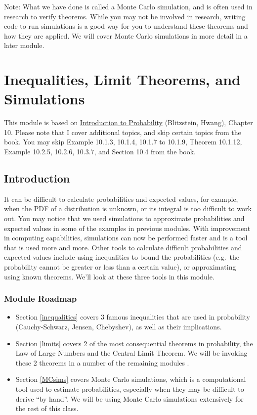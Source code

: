 \documentclass[
]{book}
\providecommand{\tightlist}{%
  \setlength{\itemsep}{0pt}\setlength{\parskip}{0pt}}
\begin{document}
Note: What we have done is called a Monte Carlo simulation, and is often used in research to verify theorems. While you may not be involved in research, writing code to run simulations is a good way for you to understand these theorems and how they are applied. We will cover Monte Carlo simulations in more detail in a later module.

\hypertarget{inequalities-limit-theorems-and-simulations}{%
\chapter{Inequalities, Limit Theorems, and Simulations}\label{inequalities-limit-theorems-and-simulations}}

This module is based on \href{https://stat110.hsites.harvard.edu/}{Introduction to Probability} (Blitzstein, Hwang), Chapter 10. Please note that I cover additional topics, and skip certain topics from the book. You may skip Example 10.1.3, 10.1.4, 10.1.7 to 10.1.9, Theorem 10.1.12, Example 10.2.5, 10.2.6, 10.3.7, and Section 10.4 from the book.

\hypertarget{introduction-2}{%
\section{Introduction}\label{introduction-2}}

It can be difficult to calculate probabilities and expected values, for example, when the PDF of a distribution is unknown, or its integral is too difficult to work out. You may notice that we used simulations to approximate probabilities and expected values in some of the examples in previous modules. With improvement in computing capabilities, simulations can now be performed faster and is a tool that is used more and more. Other tools to calculate difficult probabilities and expected values include using inequalities to bound the probabilities (e.g.~the probability cannot be greater or less than a certain value), or approximating using known theorems. We'll look at these three tools in this module.

\hypertarget{module-roadmap-4}{%
\subsection{Module Roadmap}\label{module-roadmap-4}}

\begin{itemize}
\tightlist
\item
  Section \ref{inequalities} covers 3 famous inequalities that are used in probability (Cauchy-Schwarz, Jensen, Chebyshev), as well as their implications.
\item
  Section \ref{limits} covers 2 of the most consequential theorems in probability, the Law of Large Numbers and the Central Limit Theorem. We will be invoking these 2 theorems in a number of the remaining modules .
\item
  Section \ref{MCsims} covers Monte Carlo simulations, which is a computational tool used to estimate probabilities, especially when they may be difficult to derive ``by hand''. We will be using Monte Carlo simulations extensively for the rest of this class.
\end{itemize}
\end{document}
